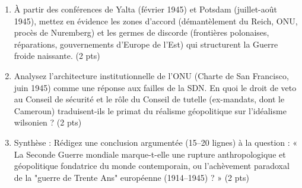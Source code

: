 \documentclass[11pt]{article}
\begin{document}
\begin{exercice}
    \begin{enumerate}
        \item À partir des conférences de Yalta (février 1945) et Potsdam (juillet-août 1945), mettez en évidence les zones d'accord (démantèlement du Reich, ONU, procès de Nuremberg) et les germes de discorde (frontières polonaises, réparations, gouvernements d'Europe de l'Est) qui structurent la Guerre froide naissante. (2 pts)
        \item Analysez l'architecture institutionnelle de l'ONU (Charte de San Francisco, juin 1945) comme une réponse aux failles de la SDN. En quoi le droit de veto au Conseil de sécurité et le rôle du Conseil de tutelle (ex-mandats, dont le Cameroun) traduisent-ils le primat du réalisme géopolitique sur l'idéalisme wilsonien ? (2 pts)
        \item Synthèse : Rédigez une conclusion argumentée (15--20 lignes) à la question : « La Seconde Guerre mondiale marque-t-elle une rupture anthropologique et géopolitique fondatrice du monde contemporain, ou l'achèvement paradoxal de la "guerre de Trente Ans" européenne (1914--1945) ? » (2 pts)
    \end{enumerate}
\end{exercice}
\end{document}
